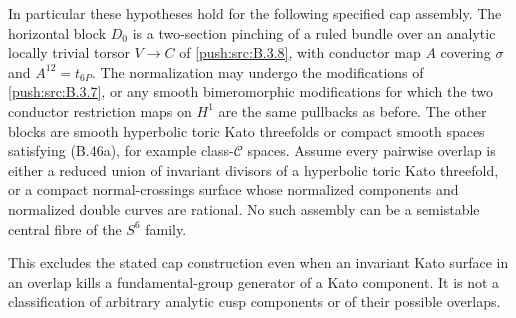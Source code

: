 \begin{proposition}
In particular these hypotheses hold for the following
specified cap assembly. The horizontal block $D_0$ is
a two-section pinching of a ruled bundle over an
analytic locally trivial torsor $V\to C$ of \ref{push:src:B.3.8},
with conductor map $A$ covering $\sigma$ and
$A^{12}=t_{6P}$. The normalization may undergo the
modifications of \ref{push:src:B.3.7}, or any smooth bimeromorphic
modifications for which the two conductor restriction
maps on $H^1$ are the same pullbacks as before.
The other blocks are smooth hyperbolic toric Kato
threefolds or compact smooth spaces satisfying
(B.46a), for example class-$\mathcal C$ spaces.
Assume every pairwise overlap is either a reduced
union of invariant divisors of a hyperbolic toric
Kato threefold, or a compact normal-crossings surface
whose normalized components and normalized double
curves are rational. No such assembly can be a
semistable central fibre of the $S^6$ family.

This excludes the stated cap construction even when
an invariant Kato surface in an overlap kills a
fundamental-group generator of a Kato component.
It is not a classification of arbitrary analytic
cusp components or of their possible overlaps.
\end{proposition}


